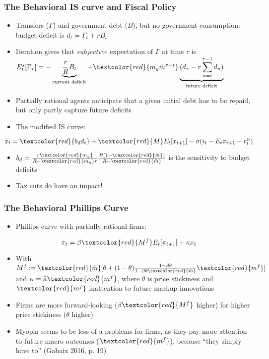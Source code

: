 \documentclass{beamer}
\begin{document}
\begin{frame}
	\frametitle{The Behavioral IS curve and Fiscal Policy}
	\begin{itemize}
		\item Transfers ($\Gamma$) and government debt ($B$), but no government consumption: budget deficit is $d_ {t}=\Gamma_{t}+rB_{t}$
		\item Iteration gives that $subjective$ expectation of $\Gamma$ at time $\tau$ is $E_{t}^{s}[\Gamma_{\tau}]=-\underbrace{\frac {r}{R}B_{t}}_\text{current deficit}+\textcolor{red}{m_{y}\bar m^{\tau-t}}\underbrace{(d_{\tau}-r \sum_{u=t}^{\tau-1}d_{u})}_\text{future deficit}$
		\item Partially rational agents anticipate that a given initial debt has to be repaid, but only partly capture future deficits
		\item The modified IS curve:

	\end{itemize}
	$$x_{t}=\textcolor{red}{b_{d}d_{t}}+\textcolor{red}{M}E_{t}[x_{t+1}]-\sigma(i_{t}-E_{t}\pi_{t+1}-r_{t}^{n})$$
	\begin{itemize}
		 \item $b_{d}=\frac {r\textcolor{red}{m_{y}}}{R-\textcolor{red}{m_{y}}r}\frac {R(1-\textcolor{red}{\bar m})}{R-\textcolor{red}{\bar m}}$ is the sensitivity to budget deficits
		 \item Tax cuts do have an impact!
	\end{itemize}
\end{frame}


\begin{frame}
\frametitle{The Behavioral Phillips Curve}
\begin{itemize}
\item Phillips curve with partially rational firms:
\end{itemize}
	$$\pi_{t}=\beta \textcolor{red}{M^{f}}E_{t}[\pi_{t+1}]+\kappa x_{t}$$
\begin{itemize}
\item With $M^{f}:=\textcolor{red}{\bar m}[\theta+(1-\theta)\frac{1-\beta \theta}{1-\beta \theta \textcolor{red}{\bar m}}\textcolor{red}{m^{f}}]$ and $\kappa=\bar \kappa \textcolor{red}{m^{f}}$, where $\theta$ is price stickiness and $\textcolor{red}{m^{f}}$ inattention to future markup innovations
\item Firms are more forward-looking ($\beta \textcolor{red}{ M^{f}}$ higher) for higher price stickiness ($\theta$ higher) 
\item Myopia seems to be less of a problems for firms, as they pay more attention to future macro outcomes ($\textcolor{red}{m^{f}}$),  because ``they simply have to'' (Gabaix 2016, p. 19)
\end{itemize}
\end{frame}
\end{document}
